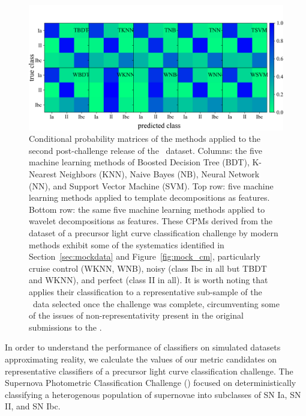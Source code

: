 \begin{figure}
	\begin{center}
    \includegraphics[width=\textwidth]{./fig/all_snphotcc_cm.png}
		\caption{Conditional probability matrices of the \citet{lochner_photometric_2016} methods applied to the second post-challenge release of the \snphotcc\ dataset.
		Columns: the five machine learning methods of Boosted Decision Tree (BDT), K-Nearest Neighbors (KNN), Naive Bayes (NB), Neural Network (NN), and Support Vector Machine (SVM).
    Top row: five machine learning methods applied to template decompositions as features.
    Bottom row: the same five machine learning methods applied to wavelet decompositions as features.
		These CPMs derived from the dataset of a precursor light curve classification challenge by modern methods exhibit some of the systematics identified in Section~\ref{sec:mockdata} and Figure~\ref{fig:mock_cm}, particularly cruise control (WKNN, WNB), noisy (class Ibc in all but TBDT and WKNN), and perfect (class II in all).
		It is worth noting that \citet{lochner_photometric_2016} applies their classification to a representative sub-sample of the \snphotcc\ data selected once the challenge was complete, circumventing some of the issues of non-representativity present in the original submissions to the \snphotcc.}
		\label{fig:snphotcc_cm}
	\end{center}
\end{figure}


In order to understand the performance of classifiers on simulated datasets approximating reality, we calculate the values of our metric candidates on representative classifiers of a precursor light curve classification challenge.
The Supernova Photometric Classification Challenge (\snphotcc) \citep{kessler_supernova_2010} focused on deterministically classifying a heterogenous population of supernovae into subclasses of SN Ia, SN II, and SN Ibc.


